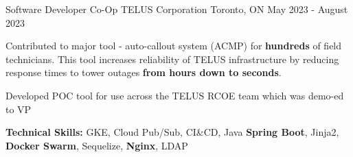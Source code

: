\begin{cventries}
	\cventry
	{Software Developer Co-Op} %
	{TELUS Corporation} %
	{Toronto, ON} %
	{May 2023 - August 2023} %
	{
		\begin{cvitems} %
			\item {Contributed to major tool - auto-callout system (ACMP) for \textbf{hundreds} of field technicians. This tool increases reliability of TELUS infrastructure by reducing response times to tower outages \textbf{from hours down to seconds}.}
			\item {Developed POC tool for use across the TELUS RCOE team which was demo-ed to VP}
			\item[] {\textbf{Technical Skills:} GKE, Cloud Pub/Sub, CI\&CD, Java \textbf{Spring Boot}, Jinja2, \textbf{Docker Swarm}, Sequelize, \textbf{Nginx}, LDAP}
		\end{cvitems}
	}


\end{cventries}
